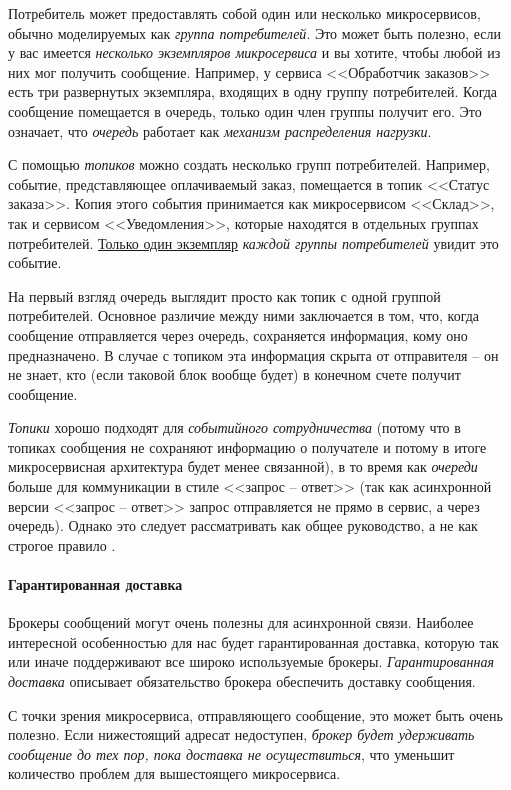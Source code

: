 \documentclass[%
	11pt,
	a4paper,
	utf8,
		]{article}
\begin{document}
Потребитель может предоставлять собой один или несколько микросервисов, обычно моделируемых как \emph{группа потребителей}. Это может быть полезно, если у вас имеется \emph{несколько экземпляров микросервиса} и вы хотите, чтобы любой из них мог получить сообщение. Например, у сервиса <<Обработчик заказов>> есть три развернутых экземпляра, входящих в одну группу потребителей. Когда сообщение помещается в очередь, только один член группы получит его. Это означает, что \emph{очередь} работает как \emph{механизм распределения нагрузки}.

С помощью \emph{топиков} можно создать несколько групп потребителей. Например, событие, представляющее оплачиваемый заказ, помещается в топик <<Статус заказа>>. Копия этого события принимается как микросервисом <<Склад>>, так и сервисом <<Уведомления>>, которые находятся в отдельных группах потребителей. \underline{Только один экземпляр} \emph{каждой группы потребителей} увидит это событие.

На первый взгляд очередь выглядит просто как топик с одной группой потребителей. Основное различие между ними заключается в том, что, когда сообщение отправляется через очередь, сохраняется информация, кому оно предназначено. В случае с топиком эта информация скрыта от отправителя -- он не знает, кто (если таковой блок вообще будет) в конечном счете получит сообщение.

{\color{blue} \emph{Топики} хорошо подходят для \emph{событийного сотрудничества} (потому что в топиках сообщения не сохраняют информацию о получателе и потому в итоге микросервисная архитектура будет менее связанной), в то время как \emph{очереди} больше для коммуникации в стиле <<запрос -- ответ>>} (так как асинхронной версии <<запрос -- ответ>> запрос отправляется не прямо в сервис, а через очередь). Однако это следует рассматривать как общее руководство, а не как строгое правило \cite[]{microservices-2024}.

\paragraph{Гарантированная доставка} Брокеры сообщений могут очень полезны для асинхронной связи. Наиболее интересной особенностью для нас будет гарантированная доставка, которую так или иначе поддерживают все широко используемые брокеры. \emph{Гарантированная доставка} описывает обязательство брокера обеспечить доставку сообщения.

С точки зрения микросервиса, отправляющего сообщение, это может быть очень полезно. Если нижестоящий адресат недоступен, \emph{брокер будет удерживать сообщение до тех пор, пока доставка не осуществиться}, что уменьшит количество проблем для вышестоящего микросервиса.
\end{document}
